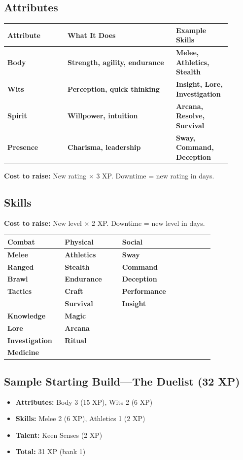 \documentclass[10pt,twocolumn]{article} %
\begin{document}
\subsection{Attributes}
\begin{coretable}[Attributes]
\begin{tabular}{>{\bfseries}p{0.25\linewidth} >{\bfseries}p{0.45\linewidth} >{\bfseries}p{0.2\linewidth}}
\toprule
\textbf{Attribute} & \textbf{What It Does} & \textbf{Example Skills} \\
\midrule
Body & Strength, agility, endurance & Melee, Athletics, Stealth \\
Wits & Perception, quick thinking & Insight, Lore, Investigation \\
Spirit & Willpower, intuition & Arcana, Resolve, Survival \\
Presence & Charisma, leadership & Sway, Command, Deception \\
\bottomrule
\end{tabular}
\end{coretable}
\textbf{Cost to raise:} New rating $\times$ 3 XP. Downtime = new rating in days.

\subsection{Skills}
\textbf{Cost to raise:} New level $\times$ 2 XP. Downtime = new level in days.
\begin{coretable}
\begin{tabular}{>{\bfseries}p{0.25\linewidth} >{\bfseries}p{0.25\linewidth} >{\bfseries}p{0.4\linewidth}}
\toprule
\textbf{Combat} & \textbf{Physical} & \textbf{Social} \\
\midrule
Melee & Athletics & Sway \\
Ranged & Stealth & Command \\
Brawl & Endurance & Deception \\
Tactics & Craft & Performance \\
& Survival & Insight \\
\addlinespace
\textbf{Knowledge} & \textbf{Magic} & \\
Lore & Arcana & \\
Investigation & Ritual & \\
Medicine & & \\
\bottomrule
\end{tabular}
\end{coretable}

\subsection{Sample Starting Build—The Duelist (32 XP)}
\begin{itemize}[leftmargin=*]
    \item \textbf{Attributes:} Body 3 (15 XP), Wits 2 (6 XP)
    \item \textbf{Skills:} Melee 2 (6 XP), Athletics 1 (2 XP)
    \item \textbf{Talent:} Keen Senses (2 XP)
    \item \textbf{Total:} 31 XP (bank 1)
\end{itemize}
\end{document}
